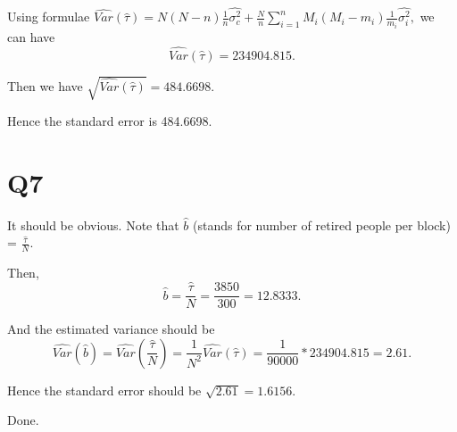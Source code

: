 \documentclass[12pt]{article}%
\begin{document}
Using formulae $\hat{Var}(\hat{\tau})=N(N-n)\frac{1}{n}\hat{\sigma_c^2} + \frac{N}{n}\sum_{i=1}^{n}M_i(M_i-m_i)\frac{1}{m_i}\hat{\sigma_i^2},$ we can have $$\hat{Var}(\hat{\tau})=234904.815.$$

Then we have $\sqrt{\hat{Var}(\hat{\tau})}=484.6698.$

Hence the standard error is 484.6698.




\section{Q7}
It should be obvious. Note that $\hat{b}$ (stands for number of retired people per block) = $\frac{\hat{\tau}}{N}.$ 

Then, $$\hat{b} = \frac{\hat{\tau}}{N} = \frac{3850}{300}=12.8333.$$

And the estimated variance should be $$\hat{Var}(\hat{b})=\hat{Var}( \frac{\hat{\tau}}{N} )= \frac{1}{N^2} \hat{Var}(\hat{\tau}) = \frac{1}{90000}*234904.815 = 2.61.$$

Hence the standard error should be $\sqrt{2.61}=1.6156.$

Done.
\end{document}
